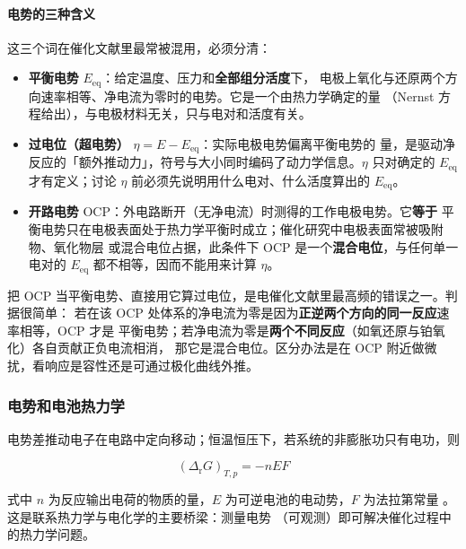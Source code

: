 \paragraph{电势的三种含义} 这三个词在催化文献里最常被混用，必须分清：

\begin{itemize}
\item \textbf{平衡电势} $E_{\mathrm{eq}}$：给定温度、压力和\textbf{全部组分活度}下，
  电极上氧化与还原两个方向速率相等、净电流为零时的电势。它是一个由热力学确定的量
  （Nernst 方程给出），与电极材料无关，只与电对和活度有关。
\item \textbf{过电位（超电势）} $\eta=E-E_{\mathrm{eq}}$：实际电极电势偏离平衡电势的
  量，是驱动净反应的「额外推动力」，符号与大小同时编码了动力学信息。$\eta$ 只对确定的
  $E_{\mathrm{eq}}$ 才有定义；讨论 $\eta$ 前必须先说明用什么电对、什么活度算出的
  $E_{\mathrm{eq}}$。
\item \textbf{开路电势} OCP：外电路断开（无净电流）时测得的工作电极电势。它\textbf{等于}
  平衡电势只在电极表面处于热力学平衡时成立；催化研究中电极表面常被吸附物、氧化物层
  或混合电位占据，此条件下 OCP 是一个\textbf{混合电位}，与任何单一电对的
  $E_{\mathrm{eq}}$ 都不相等，因而不能用来计算 $\eta$。
\end{itemize}

\begin{pitfall}
把 OCP 当平衡电势、直接用它算过电位，是电催化文献里最高频的错误之一。判据很简单：
若在该 OCP 处体系的净电流为零是因为\textbf{正逆两个方向的同一反应}速率相等，OCP 才是
平衡电势；若净电流为零是\textbf{两个不同反应}（如氧还原与铂氧化）各自贡献正负电流相消，
那它是混合电位。区分办法是在 OCP 附近做微扰，看响应是容性还是可通过极化曲线外推。
\end{pitfall}

\subsubsection{电势和电池热力学}

电势差推动电子在电路中定向移动；恒温恒压下，若系统的非膨胀功只有电功，则

\begin{equation}
(\Delta_{\mathrm{r}}G)_{T,p}=-nEF
\label{eq:gibbs-emf}
\end{equation}

式中 $n$ 为反应输出电荷的物质的量，$E$ 为可逆电池的电动势，$F$ 为法拉第常量
。这是联系热力学与电化学的主要桥梁：测量电势
（可观测）即可解决催化过程中的热力学问题。

